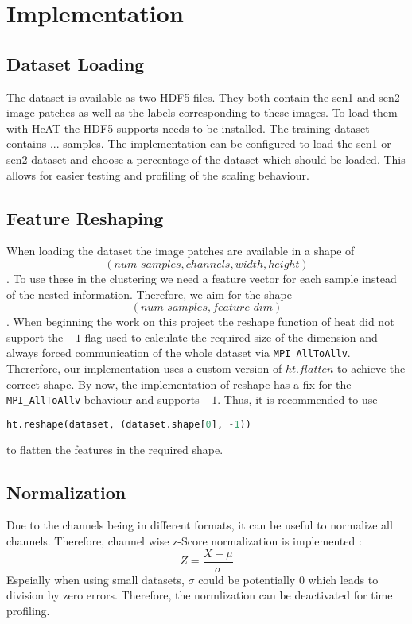 \section{Implementation}
\label{sec:implementation}

\subsection{Dataset Loading}
\label{subsec:dataset_loading}
The dataset is available as two HDF5 files. They both contain the sen1 and sen2 image patches as well as the labels
corresponding to these images.
To load them with \gls{HeAT} the HDF5 supports needs to be installed.
The training dataset contains ... samples. The implementation can be configured to load
the sen1 or sen2 dataset and choose a percentage of the dataset which should be loaded.
This allows for easier testing and profiling of the scaling behaviour.


\subsection{Feature Reshaping}
\label{subsec:feature_reshaping}
When loading the dataset the image patches are available in a shape of \[(num\_samples, channels, width, height)\].
To use these in the clustering we need a feature vector for each sample instead of the nested information. Therefore,
we aim for the shape \[(num\_samples, feature\_dim)\].
When beginning the work on this project the reshape function of heat did not support the \(-1\) flag used to
calculate the required size of the dimension and always forced communication of the whole dataset via \lstinline{MPI_AllToAllv}.
Thererfore, our implementation uses a custom version of \(ht.flatten\) to achieve the correct shape.
By now, the implementation of reshape has a fix for the \lstinline{MPI_AllToAllv} behaviour and supports \(-1\).
Thus, it is recommended to use \begin{lstlisting}[language=Python]
    ht.reshape(dataset, (dataset.shape[0], -1))
\end{lstlisting}
to flatten the features in the required shape.

\subsection{Normalization}
\label{subsec:normalization}
Due to the channels being in different formats, it can be useful to normalize all channels.
Therefore, channel wise z-Score normalization is implemented \cite{wooldridge_introductory_2012}:
\[Z = \frac{X - \mu}{\sigma}\]
Espeially when using small datasets, \(\sigma\) could be potentially \(0\) which leads to division by zero errors.
Therefore, the normlization can be deactivated for time profiling.


